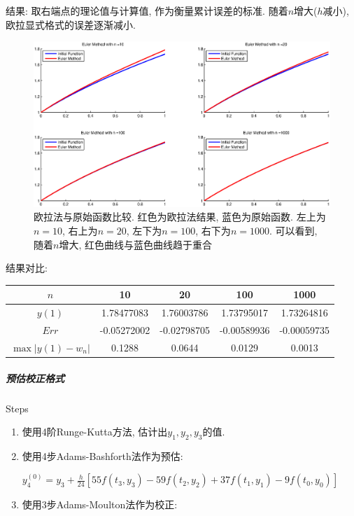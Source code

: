 \documentclass{article}
\begin{document}
\begin{CJK*}{UTF8}{song}
					结果: 取右端点的理论值与计算值, 作为衡量累计误差的标准. 随着$n$增大($h$减小), 欧拉显式格式的误差逐渐减小.\\				
					\begin{figure}[H]
						\centering
						\includegraphics[width=1.0\textwidth]{../chapter5_1_1.eps}
						\caption{欧拉法与原始函数比较. 红色为欧拉法结果, 蓝色为原始函数. 左上为$n=10$, 右上为$n=20$, 左下为$n=100$, 右下为$n=1000$. 可以看到, 随着$n$增大, 红色曲线与蓝色曲线趋于重合}
						\label{img_chapter5_1_1}
					\end{figure}
						
						结果对比:\\
					\begin{tabular}{|c|c|c|c|c|}
						\hline
						$n$    & 10 & 20 & 100 & 1000\\
						\hline
						$y(1)$&1.78477083 & 1.76003786 & 1.73795017 & 1.73264816 \\
						\hline
						$Err$&-0.05272002 & -0.02798705 & -0.00589936 & -0.00059735 \\
						\hline
						$\max \left|y\left(1\right) - w_{n} \right|$ & 0.1288 & 0.0644 & 0.0129 & 0.0013\\
						\hline
					\end{tabular}
				\subparagraph{预估校正格式}
					Steps
					\begin{enumerate}
						\item 使用4阶Runge-Kutta方法, 估计出$y_1,y_2,y_3$的值.
						\item 使用4步Adams-Bashforth法作为预估:
						
						 $y_4^{\left(0\right)} = y_3 + \frac{h}{24}\left[55f\left(t_3,y_3\right) - 59f\left(t_2,y_2\right) + 37f\left(t_1,y_1\right) - 9f\left(t_0,y_0\right) \right]$
						\item 使用3步Adams-Moulton法作为校正:
						

\end{enumerate}
\end{CJK*}
\end{document}
